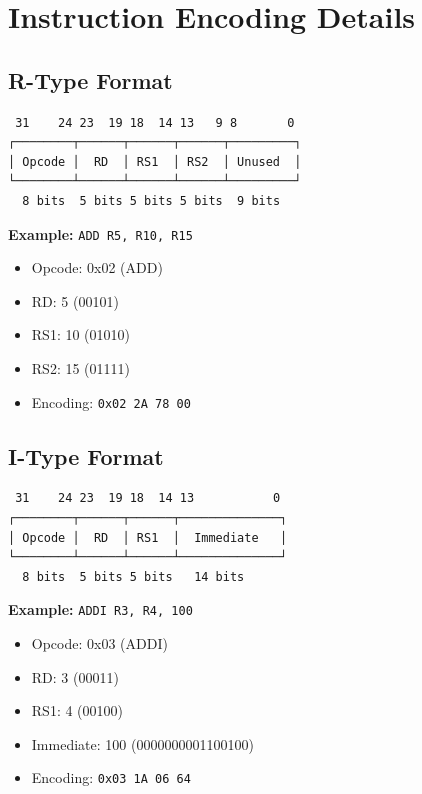 \documentclass[12pt,a4paper,oneside]{book}
\newcommand{\code}[1]{\texttt{#1}}
\begin{document}
\section{Instruction Encoding Details}

\subsection{R-Type Format}

\begin{verbatim}
 31    24 23  19 18  14 13   9 8       0
┌────────┬──────┬──────┬──────┬─────────┐
│ Opcode │  RD  │ RS1  │ RS2  │ Unused  │
└────────┴──────┴──────┴──────┴─────────┘
  8 bits  5 bits 5 bits 5 bits  9 bits
\end{verbatim}

\textbf{Example:} \code{ADD R5, R10, R15}

\begin{itemize}
    \item Opcode: 0x02 (ADD)
    \item RD: 5 (00101)
    \item RS1: 10 (01010)
    \item RS2: 15 (01111)
    \item Encoding: \code{0x02 2A 78 00}
\end{itemize}

\subsection{I-Type Format}

\begin{verbatim}
 31    24 23  19 18  14 13           0
┌────────┬──────┬──────┬──────────────┐
│ Opcode │  RD  │ RS1  │  Immediate   │
└────────┴──────┴──────┴──────────────┘
  8 bits  5 bits 5 bits   14 bits
\end{verbatim}

\textbf{Example:} \code{ADDI R3, R4, 100}

\begin{itemize}
    \item Opcode: 0x03 (ADDI)
    \item RD: 3 (00011)
    \item RS1: 4 (00100)
    \item Immediate: 100 (0000000001100100)
    \item Encoding: \code{0x03 1A 06 64}
\end{itemize}

\end{document}
